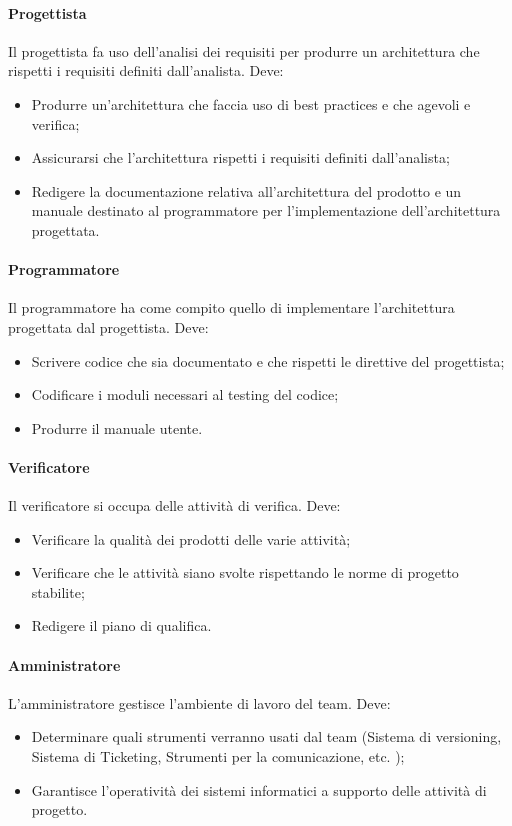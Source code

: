 \paragraph{Progettista} \Spazio
Il progettista fa uso dell'analisi dei requisiti per produrre un architettura che rispetti i requisiti definiti dall'analista. Deve:
\begin{itemize}
\item Produrre un'architettura che faccia uso di best practices e che agevoli  e verifica;
\item Assicurarsi che l'architettura rispetti i requisiti definiti dall'analista;
\item Redigere la documentazione relativa all'architettura del prodotto e un manuale destinato al programmatore per l'implementazione dell'architettura progettata.
\end{itemize}

\paragraph{Programmatore} \Spazio
Il programmatore ha come compito quello di implementare l'architettura progettata dal progettista. Deve:
\begin{itemize}
\item Scrivere codice che sia documentato e che rispetti le direttive del progettista;
\item Codificare i moduli necessari al testing del codice;
\item Produrre il manuale utente.
\end{itemize}

\paragraph{Verificatore} \Spazio
Il verificatore si occupa delle attività di verifica. Deve:
\begin{itemize}
\item Verificare la qualità dei prodotti delle varie attività;
\item Verificare che le attività siano svolte rispettando le norme di progetto stabilite;
\item Redigere il piano di qualifica.
\end{itemize}

\paragraph{Amministratore} \Spazio
L'amministratore gestisce l'ambiente di lavoro del team. Deve:
\begin{itemize}
\item Determinare quali strumenti verranno usati dal team (Sistema di versioning, Sistema di Ticketing, Strumenti per la comunicazione, etc. );
\item Garantisce l'operatività dei sistemi informatici a supporto delle attività di progetto.
\end{itemize}

